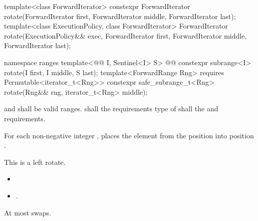 %
\begin{itemdecl}
template<class ForwardIterator>
  constexpr ForwardIterator
    rotate(ForwardIterator first, ForwardIterator middle, ForwardIterator last);
template<class ExecutionPolicy, class ForwardIterator>
  ForwardIterator
    rotate(ExecutionPolicy&& exec,
           ForwardIterator first, ForwardIterator middle, ForwardIterator last);
\end{itemdecl}
\begin{addedblock}
\begin{itemdecl}
namespace ranges {
  template<@@ I, Sentinel<I> S>
    @@
    constexpr subrange<I> rotate(I first, I middle, S last);
  template<ForwardRange Rng>
    requires Permutable<iterator_t<Rng>>
    constexpr safe_subrange_t<Rng> rotate(Rng&& rng, iterator_t<Rng> middle);
}
\end{itemdecl}
\end{addedblock}

\begin{itemdescr}
\pnum
\requires
{}
and
shall be valid ranges.
 shall  the
requirements
type of  shall 
the  and
 requirements.

\pnum
\effects
For each non-negative integer
,
places the element from the position
into position
.
\begin{addedblock}
\begin{note}
This is a left rotate.
\end{note}
\end{addedblock}

\pnum
\returns
\begin{itemize}
\item {} 
\item {}.
\end{itemize}

\pnum
{}

\pnum
\complexity
At most
swaps.
\end{itemdescr}


